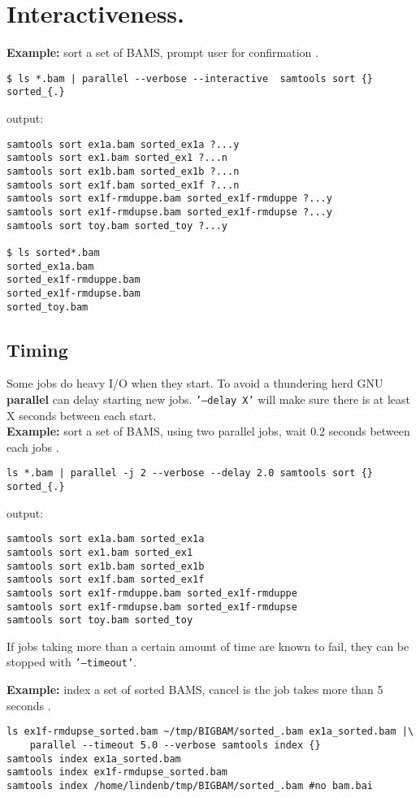 \documentclass{article}
\newcommand{\example}[1]{
\textbf{Example: } {\color[rgb]{0,0,1} #1 } .
}
\newcommand{\cmdoption}[1]{\texttt{'#1'}}
\def\prl{\textbf{parallel}}
\begin{document}
\section{Interactiveness.}
\example{sort a set of BAMS, prompt user for confirmation }
\begin{lstlisting}
$ ls *.bam | parallel --verbose --interactive  samtools sort {} sorted_{.}
\end{lstlisting}
output:
\begin{lstlisting}
samtools sort ex1a.bam sorted_ex1a ?...y
samtools sort ex1.bam sorted_ex1 ?...n
samtools sort ex1b.bam sorted_ex1b ?...n
samtools sort ex1f.bam sorted_ex1f ?...n
samtools sort ex1f-rmduppe.bam sorted_ex1f-rmduppe ?...y
samtools sort ex1f-rmdupse.bam sorted_ex1f-rmdupse ?...y
samtools sort toy.bam sorted_toy ?...y

$ ls sorted*.bam
sorted_ex1a.bam
sorted_ex1f-rmduppe.bam
sorted_ex1f-rmdupse.bam
sorted_toy.bam
\end{lstlisting}



\subsection{Timing}
Some jobs do heavy I/O when they start. To avoid a thundering herd GNU \prl{} can delay starting new jobs. \cmdoption{--delay X} will make sure there is at least X seconds between each start.\\
\example{sort a set of BAMS, using two parallel jobs, wait 0.2 seconds between each jobs}
\begin{lstlisting}
ls *.bam | parallel -j 2 --verbose --delay 2.0 samtools sort {} sorted_{.}
\end{lstlisting}
output:
\begin{lstlisting}
samtools sort ex1a.bam sorted_ex1a
samtools sort ex1.bam sorted_ex1
samtools sort ex1b.bam sorted_ex1b
samtools sort ex1f.bam sorted_ex1f
samtools sort ex1f-rmduppe.bam sorted_ex1f-rmduppe
samtools sort ex1f-rmdupse.bam sorted_ex1f-rmdupse
samtools sort toy.bam sorted_toy
\end{lstlisting}
If jobs taking more than a certain amount of time are known to fail, they can be stopped with \cmdoption{--timeout}.
\example{index a set of sorted BAMS, cancel is the job takes more than 5 seconds}
\begin{lstlisting}
ls ex1f-rmdupse_sorted.bam ~/tmp/BIGBAM/sorted_.bam ex1a_sorted.bam |\
	parallel --timeout 5.0 --verbose samtools index {} 
samtools index ex1a_sorted.bam
samtools index ex1f-rmdupse_sorted.bam
samtools index /home/lindenb/tmp/BIGBAM/sorted_.bam #no bam.bai
\end{lstlisting}
\end{document}

